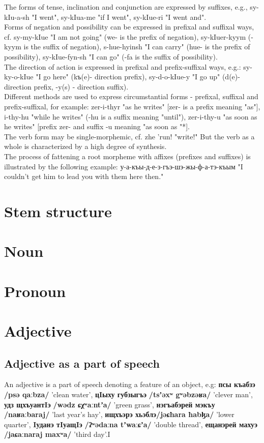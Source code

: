 \documentclass[a4paper,12pt]{book}
\newcommand{\1}[1]{\textbf{\emph{#1}}} %
\newcommand{\2}[1]{\textbf{[#1]}} %
\newcommand{\3}[1]{\fontsize{11pt}{0cm}\textbf{\emph{#1}}} %
\newcommand{\4}[1]{\fontsize{10pt}{0cm}\emph{#1}}	%
\newcommand{\5}[1]{\textbf{/#1/}} %
\newcommand{\6}[1]{\textbf{[#1]}} %
\newcommand{\7}[1]{\fontsize{12pt}{0cm}\emph{#1}} %
\newcommand{\8}[1]{\fontsize{12pt}{0cm}`#1'} %
\newcommand{\9}[1]{\fontsize{12pt}{0cm}(lit. `#1')} %
\newcommand{\glossphonemics}[1]{\textbf{/#1/}} %
\begin{document}
The forms of tense, inclination and conjunction are expressed by suffixes, e.g., sy-kIu-a-sh "I went", sy-kIua-me "if I went", sy-kIue-ri "I went and".\\
Forms of negation and possibility can be expressed in prefixal and suffixal ways, cf. sy-my-kIue "I am not going" (we- is the prefix of negation), sy-kIuer-kyym (-kyym is the suffix of negation), s-hue-hyinsh "I can carry" (hue- is the prefix of possibility), sy-kIue-fyn-sh "I can go" (-fa is the suffix of possibility).\\
The direction of action is expressed in prefixal and prefix-suffixal ways, e.g.: sy-ky-o-kIue "I go here" (kъ(e)- direction prefix), sy-d-o-kIue-y "I go up" (d(e)- direction prefix, -y(s) - direction suffix).\\
Different methods are used to express circumstantial forms - prefixal, suffixal and prefix-suffixal, for example: zer-i-thyr "as he writes" [zer- is a prefix meaning "as"], i-thy-hu "while he writes" (-hu is a suffix meaning "until"), zer-i-thy-u "as soon as he writes" [prefix zer- and suffix -u meaning "as soon as "*].\\
The verb form may be single-morphemic, cf. zhe 'run! "write!" But the verb as a whole is characterized by a high degree of synthesis.\\
The process of fattening a root morpheme with affixes (prefixes and suffixes) is illustrated by the following example:
у-а-къы-д-е-з-гъэ-шэ-жы-ф-а-тэ-къым "I couldn't get him to lead you with them here then."\\

\section{Stem structure}
\section{Noun}
\section{Pronoun}
\section{Adjective}
\subsection{Adjective as a part of speech}
An adjective is a part of speech denoting a feature of an object, e.g: \textbf{псы къабзэ} \glossphonemics{psə qaːbza} 'clean water', \textbf{цIыху губзыгъэ} \glossphonemics{tsʼəxʷ gʷəbzəʁa} 'clever man', \textbf{удз щхъуантIэ} \glossphonemics{wədz ɕχʷaːntʼa} 'green grass', \textbf{нэгъабэрей мэкъу} \glossphonemics{naʁaːbaraj} 'last year's hay', \textbf{ищхъэрэ хьэблэ}\glossphonemics{jəɕħara ħabɮa} 'lower quarter', \textbf{Iуданэ тIуащIэ} \glossphonemics{ʔʷədaːna tʼwaːɕʼa} 'double thread', \textbf{ещанэрей махуэ} \glossphonemics{jaɕaːnaraj maxʷa} 'third day'.I
\end{document}
